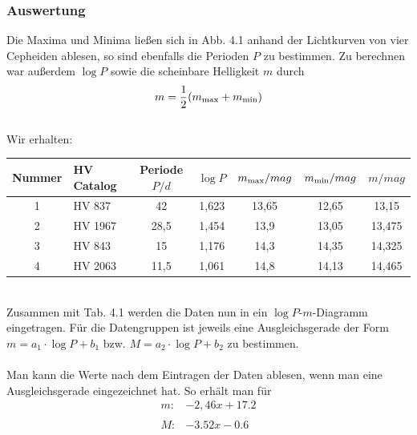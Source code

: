 \documentclass[12pt]{article}
\begin{document}
\subsubsection*{Auswertung}
Die Maxima und Minima ließen sich in Abb. 4.1 anhand der Lichtkurven von vier Cepheiden ablesen, so sind ebenfalls die Perioden $P$ zu bestimmen. Zu berechnen war außerdem $\log P$ sowie die scheinbare Helligkeit $m$ durch
\[m = \frac{1}{2}(m_{\textnormal{max}}+m_\textnormal{min})\]\\
Wir erhalten:
\begin{table}[!ht]
    \centering
    \begin{tabular}{c|l|c|c|c|c|c}
        Nummer & HV Catalog & Periode $P/d$ & $\log P$ & $m_{\textnormal{max}}/ mag$ &$m_{\textnormal{min}} / mag$ & $m / mag$ \\ \hline 
        1 & HV 837 & 42 & 1,623 & 13,65 & 12,65 & 13,15 \\ 
        2 & HV 1967 & 28,5 & 1,454 & 13,9 & 13,05 & 13,475 \\ 
        3 & HV 843 & 15 & 1,176 & 14,3 & 14,35 & 14,325 \\
        4 & HV 2063 & 11,5 & 1,061 & 14,8 & 14,13 & 14,465 \\
    \end{tabular}
\end{table}\\
Zusammen mit Tab. 4.1 werden die Daten nun in ein $\log P$-$m$-Diagramm eingetragen. Für die Datengruppen ist jeweils eine Ausgleichsgerade der Form $m=a_1 \cdot \log P + b_1$ bzw. $M=a_2 \cdot \log P + b_2$ zu bestimmen.\\\\
Man kann die Werte nach dem Eintragen der Daten ablesen, wenn man eine Ausgleichsgerade eingezeichnet hat. So erhält man für
\[\begin{aligned}
    m: &-2,46 x + 17.2\\\\
    M: & -3.52 x - 0.6
\end{aligned}\]
\newpage\noindent
%
\end{document}
